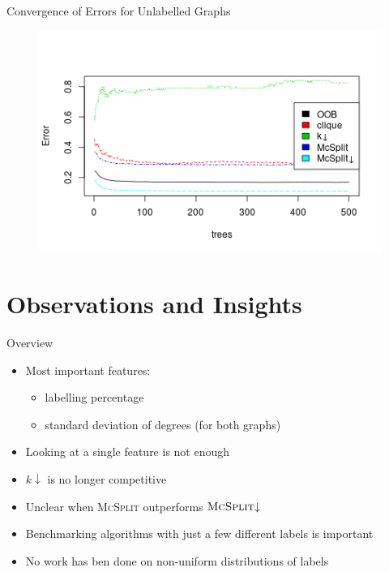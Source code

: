 \documentclass{beamer}
\begin{document}
\begin{frame}{Convergence of Errors for Unlabelled Graphs}
  \begin{figure}
    \centering
    \includegraphics[scale=0.5]{../dissertation/images/unlabelled_forest_errors.png}
  \end{figure}
\end{frame}

\section{Observations and Insights}

\begin{frame}{Overview}
  \begin{itemize}
  \item Most important features:
    \begin{itemize}
    \item labelling percentage
    \item standard deviation of degrees (for both graphs)
    \end{itemize}
  \item Looking at a single feature is not enough
    \pause
  \item $k{\downarrow}$ is no longer competitive
  \item Unclear when \textsc{McSplit} outperforms $\textsc{McSplit}{\downarrow}$
    \pause
  \item Benchmarking algorithms with just a few different labels is important
  \item No work has ben done on non-uniform distributions of labels
  \end{itemize}
\end{frame}
\end{document}
